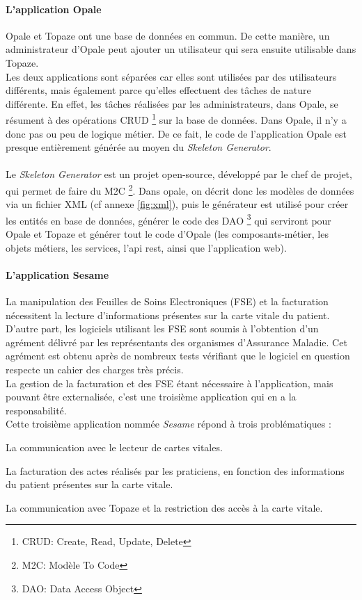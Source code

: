 \paragraph*{L'application Opale\\}
Opale et Topaze ont une base de données en commun. De cette manière, un administrateur d'Opale peut ajouter un utilisateur qui sera ensuite utilisable dans Topaze. \\
Les deux applications sont séparées car elles sont utilisées par des utilisateurs différents, mais également parce qu'elles effectuent des tâches de nature différente. En effet, les tâches réalisées par les administrateurs, dans Opale, se résument à des opérations CRUD \footnote{CRUD: Create, Read, Update, Delete} sur la base de données. Dans Opale, il n'y a donc pas ou peu de logique métier. 
De ce fait, le code de l'application Opale est presque entièrement générée au moyen du \textit{Skeleton Generator}.\\ \\
Le \textit{Skeleton Generator} est un projet open-source, développé par le chef de projet, qui permet de faire du M2C \footnote{M2C: Modèle To Code}. Dans opale, on décrit donc les modèles de données via un fichier XML (cf annexe \ref{fig:xml}), puis le générateur est utilisé pour créer les entités en base de données, générer le code des DAO \footnote{DAO: Data Access Object} qui serviront pour Opale et Topaze et générer tout le code d'Opale (les composants-métier, les objets métiers, les services, l'api rest, ainsi que l'application web). 

\paragraph*{L'application Sesame\\}

La manipulation des Feuilles de Soins Electroniques (\gls{FSE}) et la facturation nécessitent la lecture d'informations présentes sur la carte vitale du patient. D'autre part, les logiciels utilisant les \gls{FSE} sont soumis à l’obtention d’un agrément délivré
par les représentants des organismes d’Assurance Maladie. Cet agrément est obtenu après de
nombreux tests vérifiant que le logiciel en question respecte un cahier des charges très précis.\\
La gestion de la facturation et des \gls{FSE} étant nécessaire à l’application, mais pouvant
être externalisée, c’est une troisième application qui en a la responsabilité. \\
Cette troisième application nommée \textit{Sesame} répond à trois problématiques : 
\begin{sitemize}
\item La communication avec le lecteur de cartes vitales.
\item La facturation des actes réalisés par les praticiens, en fonction des informations du patient présentes sur la carte vitale.
\item La communication avec Topaze et la restriction des accès à la carte vitale.
\end{sitemize}


